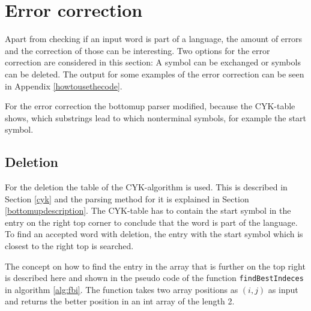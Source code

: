 \documentclass[a4paper, 11pt]{article}
\begin{document}

\pagebreak










\section{Error correction}
\label{errorcorrection}

Apart from checking if an input word is part of a language, the amount of errors and the correction of those can be interesting.
Two options for the error correction are considered in this section: A symbol can be exchanged or symbols can be deleted. The output for some examples of the error correction can be seen in Appendix \ref{howtousethecode}.

For the error correction the bottomup parser modified, because the CYK-table shows, which substrings lead to which nonterminal symbols, for example the start symbol.





\subsection{Deletion}
\label{deletion}

For the deletion the table of the CYK-algorithm is used. This is described in Section \ref{cyk} and the parsing method for it is explained in Section \ref{bottomupdescription}.
The CYK-table has to contain the start symbol in the entry on the right top corner to conclude that the word is part of the language. To find an accepted word with deletion, the entry with the start symbol which is closest to the right top is searched. 

The concept on how to find the entry in the array that is further on the top right is described here and shown in the pseudo code of the function \texttt{findBestIndeces} in algorithm \ref{alg:fbi}. The function takes two array positions as $(i,j)$ as input and returns the better position in an int array of the length 2.
\end{document}
